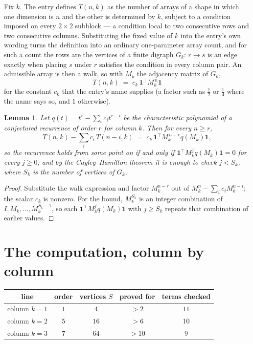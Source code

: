 \documentclass[11pt,a4paper]{article}
\theoremstyle{plain}
\newtheorem{lemma}[theorem]{Lemma}
\theoremstyle{definition}
\begin{document}
Fix $k$. The entry defines $T(n,k)$ as the number of arrays of a shape in which one dimension
is $n$ and the other is determined by $k$, subject to a condition imposed on every
$2\times2$ subblock --- a condition local to two consecutive rows and two consecutive columns.
Substituting the fixed value of $k$ into the entry's own wording turns the definition into an
ordinary one-parameter array count, and for such a count the rows are the vertices of a finite
digraph $G_k$: $r\to s$ is an edge exactly when placing $s$ under $r$ satisfies the condition
in every column pair. An admissible array is then a walk, so with $M_k$ the adjacency matrix
of $G_k$,
\[
T(n,k)\;=\;c_k\,\mathbf{1}^{\!\top}M_k^{\,n}\mathbf{1}
\]
for the constant $c_k$ that the entry's name supplies (a factor such as $\tfrac12$ or
$\tfrac14$ where the name says so, and $1$ otherwise).

\begin{lemma}\label{lem:crit}
Let $q(t)=t^{r}-\sum_i c_it^{r-i}$ be the characteristic polynomial of a conjectured
recurrence of order $r$ for column $k$. Then for every $n\ge r$,
\[
T(n,k)-\sum_i c_i\,T(n-i,k)\;=\;c_k\,\mathbf{1}^{\!\top}M_k^{\,n-r}q(M_k)\mathbf{1},
\]
so the recurrence holds from some point on if and only if
$\mathbf{1}^{\!\top}M_k^{j}q(M_k)\mathbf{1}=0$ for every $j\ge0$; and by the
Cayley--Hamilton theorem it is enough to check $j<S_k$, where $S_k$ is the number of vertices
of $G_k$.
\end{lemma}

\begin{proof}
Substitute the walk expression and factor $M_k^{n-r}$ out of $M_k^{n}-\sum_ic_iM_k^{n-i}$;
the scalar $c_k$ is nonzero. For the bound, $M_k^{S_k}$ is an integer combination of
$I,M_k,\dots,M_k^{S_k-1}$, so each $\mathbf{1}^{\!\top}M_k^{j}q(M_k)\mathbf{1}$ with
$j\ge S_k$ repeats that combination of earlier values.
\end{proof}

\section{The computation, column by column}

\begin{center}
\begin{tabular}{ccccc}
line & order & vertices $S$ & proved for & terms checked \\ \hline
column $k$$=1$ & $1$ & $4$ & $>2$ & $11$ \\
column $k$$=2$ & $5$ & $16$ & $>6$ & $10$ \\
column $k$$=3$ & $7$ & $64$ & $>10$ & $9$ \\
\end{tabular}
\end{center}
\end{document}
